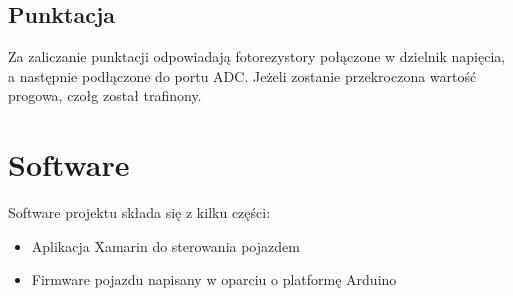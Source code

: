 \documentclass{report}
\begin{document}
		\subsection{Punktacja}
		 Za zaliczanie punktacji odpowiadają fotorezystory połączone w dzielnik napięcia, a następnie podłączone do portu ADC. Jeżeli zostanie przekroczona wartość progowa, czołg został trafinony.
		 
	\section{Software}
	Software projektu składa się z kilku części:
	\begin{itemize}
		\item Aplikacja Xamarin do sterowania pojazdem
		\item Firmware pojazdu napisany w oparciu o platformę Arduino
	\end{itemize}
\end{document}
